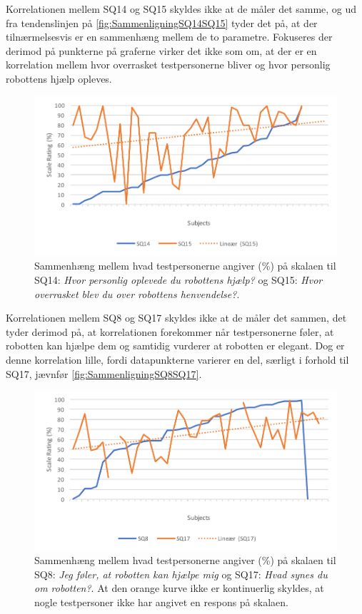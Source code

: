 \noindent
%
Korrelationen mellem SQ14 og SQ15 skyldes ikke at de måler det samme, og ud fra tendenslinjen på \autoref{fig:SammenligningSQ14SQ15} tyder det på, at der tilnærmelsesvis er en sammenhæng mellem de to parametre. Fokuseres der derimod på punkterne på graferne virker det ikke som om, at der er en korrelation mellem hvor overrasket testpersonerne bliver og hvor personlig robottens hjælp opleves.
%
\begin{figure}[H]
	\centering
	\includegraphics[width=\textwidth]{Figure/Korrelationsgrafer/SQ14+SQ15}
	\caption{Sammenhæng mellem hvad testpersonerne angiver (\%) på skalaen til SQ14: \textit{Hvor personlig oplevede du robottens hjælp?} og SQ15: \textit{Hvor overrasket blev du over robottens henvendelse?}.}
	\label{fig:SammenligningSQ14SQ15}
\end{figure}
\noindent
Korrelationen mellem SQ8 og SQ17 skyldes ikke at de måler det sammen, det tyder derimod på, at korrelationen forekommer når testpersonerne føler, at robotten kan hjælpe dem og samtidig vurderer at robotten er elegant. Dog er denne korrelation lille, fordi datapunkterne varierer en del, særligt i forhold til SQ17, jævnfør \autoref{fig:SammenligningSQ8SQ17}.  
%
\begin{figure}[H]
	\centering
	\includegraphics[width=\textwidth]{Figure/Korrelationsgrafer/SQ8+SQ17}
	\caption{Sammenhæng mellem hvad testpersonerne angiver (\%) på skalaen til SQ8: \textit{Jeg føler, at robotten kan hjælpe mig} og SQ17: \textit{Hvad synes du om robotten?}. At den orange kurve ikke er kontinuerlig skyldes, at nogle testpersoner ikke har angivet en respons på skalaen.}
	\label{fig:SammenligningSQ8SQ17}
\end{figure}
